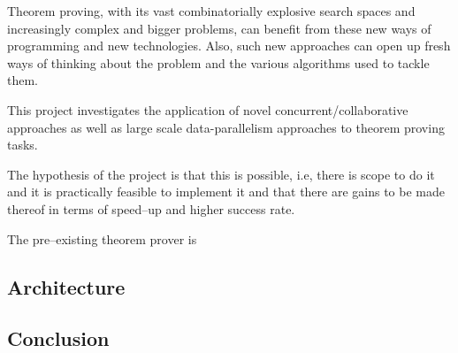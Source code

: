 \documentclass[a4paper, 11pt, oneside]{elsarticle}
\begin{document}
Theorem proving, with its vast combinatorially explosive search spaces and increasingly complex and bigger problems, can benefit from these new ways of programming and new technologies. Also, such new approaches can open up fresh ways of thinking about the problem and the various algorithms used to tackle them.

This project investigates the application of novel concurrent/collaborative approaches as well as large scale data-parallelism approaches to theorem proving tasks.

The hypothesis of the project is that this is possible, i.e, there is scope to do it and it is practically feasible to implement it and that there are gains to be made thereof in terms of speed--up and higher success rate.



The pre--existing theorem prover is %

\subsection{Architecture}

\subsection{Conclusion}



\newpage



\end{document}
